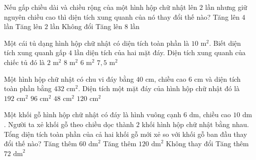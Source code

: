 \begin{ex} %
Nếu gấp chiều dài và chiều rộng của một hình hộp chữ nhật lên $2$ lần nhưng giữ nguyên chiều cao thì diện tích xung quanh của nó thay đổi thế nào?
\choice
{Tăng lên $4$ lần}
{\True Tăng lên $2$ lần}
{Không đổi}
{Tăng lên $8$ lần}
\end{ex}

\begin{ex} %
Một cái tủ dạng hình hộp chữ nhật có diện tích toàn phần là $10\text{ m}^2$. Biết diện tích xung quanh gấp $4$ lần diện tích của hai mặt đáy. Diện tích xung quanh của chiếc tủ đó là
\choice
{$2\text{ m}^2$}
{\True $8\text{ m}^2$}
{$6\text{ m}^2$}
{$7{,}5\text{ m}^2$}
\end{ex}

\begin{ex} %
Một hình hộp chữ nhật có chu vi đáy bằng $40\text{ cm}$, chiều cao $6\text{ cm}$ và diện tích toàn phần bằng $432\text{ cm}^2$. Diện tích một mặt đáy của hình hộp chữ nhật đó là
\choice
{$192\text{ cm}^2$}
{\True $96\text{ cm}^2$}
{$48\text{ cm}^2$}
{$120\text{ cm}^2$}
\end{ex}

\begin{ex} %
Một khối gỗ hình hộp chữ nhật có đáy là hình vuông cạnh $6\text{ dm}$, chiều cao $10\text{ dm}$. Người ta xẻ khối gỗ theo chiều dọc thành $2$ khối hình hộp chữ nhật bằng nhau. Tổng diện tích toàn phần của cả hai khối gỗ mới xẻ so với khối gỗ ban đầu thay đổi thế nào?
\choice
{Tăng thêm $60\text{ dm}^2$}
{\True Tăng thêm $120\text{ dm}^2$}
{Không thay đổi}
{Tăng thêm $72\text{ dm}^2$}
\end{ex}

